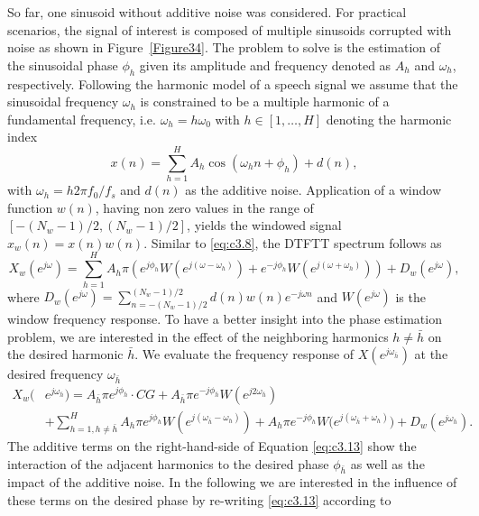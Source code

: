So far, one sinusoid without additive noise was considered. For practical scenarios, the signal of interest is composed of multiple sinusoids corrupted with noise as shown in Figure~\ref{Figure34}. The problem to solve is the estimation of the sinusoidal phase ${\phi}_{h}$ given its amplitude and frequency denoted as $A_h$ and ${\omega}_h$, respectively. Following the harmonic model of a speech signal we assume that the sinusoidal frequency ${\omega}_h$ is constrained to be a multiple harmonic of a fundamental frequency, i.e. ${\omega}_h=h{\omega}_0$ with $h\in[1,\ldots,H]$ denoting the harmonic index
\begin{equation}\label{eq:c3.11}
x(n)=\sum_{h=1}^H{A_h\cos({\omega}_hn+{\phi}_h)}+d(n),
\end{equation}
with $\omega_h=h2\pi f_0/f_s$ and $d(n)$ as the additive noise. Application of a window function $w(n)$, having non zero values in the range of $[-(N_w-1)/2,(N_w-1)/2]$, yields the windowed signal $x_w(n)=x(n)w(n)$. Similar to \eqref{eq:c3.8}, the \gls{DTFT}T spectrum follows as
\begin{equation}\label{eq:c3.12}
X_w(e^{j\omega})=\sum_{h=1}^{H} A_h\pi \left( e^{j{\phi}_h}W(e^{j(\omega-{\omega}_h)}) + e^{-j{\phi}_h}W(e^{j(\omega+{\omega}_h)})\right)+D_w(e^{j\omega}),
\end{equation}
where $D_w(e^{j\omega})=\sum_{n=-(N_w-1)/2}^{(N_w-1)/2}{d(n)w(n)e^{-j{\omega}n}}$ and $W(e^{j\omega})$ is the window frequency response. To have a better insight into the phase estimation problem, we are interested in the effect of the neighboring harmonics $h\neq \bar{h}$ on the desired harmonic $\bar{h}$. We evaluate the frequency response of $X(e^{j\omega_{\bar{h}}})$ at the desired frequency ${\omega}_{\bar{h}}$
\begin{equation}\label{eq:c3.13}
\begin{split}
X_w(&e^{j\omega_{\bar{h}}})=A_{\bar{h}}\pi e^{j{\phi}_{\bar{h}}}\cdot CG+A_{\bar{h}}\pi e^{-j{\phi}_{\bar{h}}}W(e^{j2\omega_{\bar{h}}})\\
&+\sum_{h=1,h\neq{\bar{h}}}^H {A_h\pi e^{j{\phi}_h}W(e^{j(\omega_{\bar{h}}-\omega_h)})+A_h\pi e^{-j{\phi}_h}W(e^{j(\omega_{\bar{h}}+\omega_h)}})+D_w(e^{j\omega_{\bar{h}}}).
\end{split}
\end{equation}
The additive terms on the right-hand-side of Equation \eqref{eq:c3.13} show the interaction of the adjacent harmonics to the desired phase $\phi_{\bar{h}}$ as well as the impact of the additive noise. In the following we are interested in the influence of these terms on the desired phase by re-writing \eqref{eq:c3.13} according to

